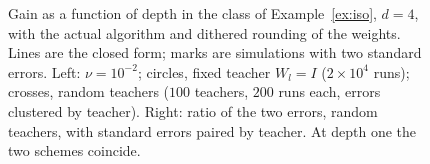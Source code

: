 \begin{figure}[t]
\caption{Gain as a function of depth in the class of Example~\ref{ex:iso}, $d=4$, with the actual algorithm and dithered rounding of the weights. Lines are the closed form; marks are simulations with two standard errors. Left: $\nu=10^{-2}$; circles, fixed teacher $W_l=I$ ($2\times10^4$ runs); crosses, random teachers ($100$ teachers, $200$ runs each, errors clustered by teacher). Right: ratio of the two errors, random teachers, with standard errors paired by teacher. At depth one the two schemes coincide.}\label{fig:gain}
\end{figure}
